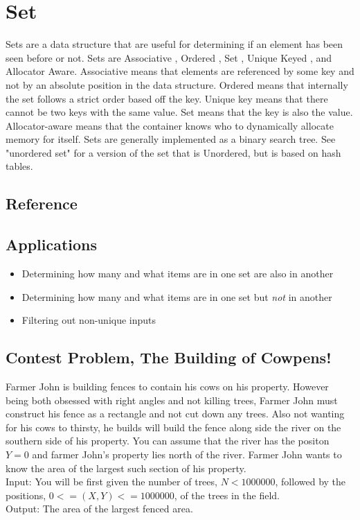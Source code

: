 \section{Set}
Sets are a data structure that are useful for determining if an element has been seen before or not.
Sets are Associative , Ordered , Set , Unique Keyed , and Allocator Aware\cite{cplusplus}.
Associative means that elements are referenced by some key and not by an absolute position in the data structure.
Ordered means that internally the set follows a strict order based off the key.
Unique key means that there cannot be two keys with the same value.
Set means that the key is also the value.
Allocator-aware means that the container knows who to dynamically allocate memory for itself.
Sets are generally implemented as a binary search tree.
See "unordered set" for a version of the set that is Unordered, but is based on hash tables.

\subsection{Reference}

\subsection{Applications}
\begin{itemize}
    \item   Determining how many and what items are in one set are also in another
    \item   Determining how many and what items are in one set but \emph{not} in another
    \item   Filtering out non-unique inputs
\end{itemize}

\subsection{Contest Problem, The Building of Cowpens!}
Farmer John is building fences to contain his cows on his property.
However being both obsessed with right angles and not killing trees, Farmer John must construct his fence as a rectangle and not cut down any trees.
Also not wanting for his cows to thirsty, he builds will build the fence along side the river on the southern side of his property.
You can assume that the river has the positon $Y=0$ and farmer John's property lies north of the river.
Farmer John wants to know the area of the largest such section of his property.\\
Input: You will be first given the number of trees, $N<1000000$, followed by the positions, $0<=(X,Y) <= 1000000$, of the trees in the field. \\
Output: The area of the largest fenced area.
